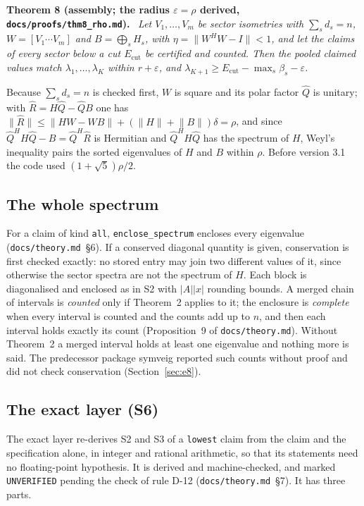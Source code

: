 \documentclass[11pt,a4paper]{article}
\newcommand{\code}[1]{\texttt{#1}}
\newcommand{\norm}[1]{\lVert #1\rVert}
\newcommand{\abs}[1]{\lvert #1\rvert}
\newenvironment{result}[1]{\par\medskip\noindent\textbf{#1.}\ \itshape}{\par\medskip}
\begin{document}
\begin{result}{Theorem 8 (assembly; the radius $\varepsilon=\rho$ derived, \code{docs/proofs/thm8\_rho.md})}
Let $V_1,\dots,V_m$ be sector isometries with $\sum_sd_s=n$, $W=[V_1\cdots V_m]$ and $B=\bigoplus_sH_s$, with
$\eta=\norm{W^HW-I}<1$, and let the claims of every sector below a cut $E_{\mathrm{cut}}$ be certified and counted.
Then the pooled claimed values match $\lambda_1,\dots,\lambda_K$ within $r+\varepsilon$, and
$\lambda_{K+1}\ge E_{\mathrm{cut}}-\max_s\beta_s-\varepsilon$.
\end{result}

Because $\sum_sd_s=n$ is checked first, $W$ is square and its polar factor $\hat Q$ is unitary; with $\hat R=H\hat
Q-\hat QB$ one has $\norm{\hat R}\le\norm{HW-WB}+(\norm{H}+\norm{B})\delta=\rho$, and since $\hat Q^HH\hat Q-B=\hat
Q^H\hat R$ is Hermitian and $\hat Q^HH\hat Q$ has the spectrum of $H$, Weyl's inequality pairs the sorted eigenvalues
of $H$ and $B$ within $\rho$. Before version 3.1 the code used $(1+\sqrt5)\rho/2$.

\subsection{The whole spectrum}

For a claim of kind \code{all}, \code{enclose\_spectrum} encloses every eigenvalue (\code{docs/theory.md}~\S6). If a
conserved diagonal quantity is given, conservation is first checked exactly: no stored entry may join two different
values of it, since otherwise the sector spectra are not the spectrum of $H$. Each block is diagonalised and enclosed
as in S2 with $\abs{A}\abs{x}$ rounding bounds. A merged chain of intervals is \emph{counted} only if Theorem~2
applies to it; the enclosure is \emph{complete} when every interval is counted and the counts add up to $n$, and then
each interval holds exactly its count (Proposition~9 of \code{docs/theory.md}). Without Theorem~2 a merged interval
holds at least one eigenvalue and nothing more is said. The predecessor package symveig reported such counts without
proof and did not check conservation (Section~\ref{sec:e8}).

\subsection{The exact layer (S6)}
\label{sec:exact}

The exact layer re-derives S2 and S3 of a \code{lowest} claim from the claim and the specification alone, in integer
and rational arithmetic, so that its statements need no floating-point hypothesis. It is derived and machine-checked,
and marked \code{UNVERIFIED} pending the check of rule D-12 (\code{docs/theory.md}~\S7). It has three parts.
\end{document}
